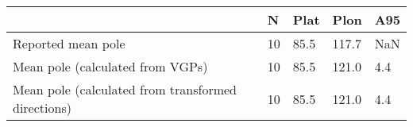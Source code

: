 \begin{tabular}{lllll}
\toprule
{} &   N &  Plat &   Plon &  A95 \\
\midrule
Reported mean pole                                 &  10 &  85.5 &  117.7 &  NaN \\
Mean pole (calculated from VGPs)                   &  10 &  85.5 &  121.0 &  4.4 \\
Mean pole (calculated from transformed directions) &  10 &  85.5 &  121.0 &  4.4 \\
\bottomrule
\end{tabular}
